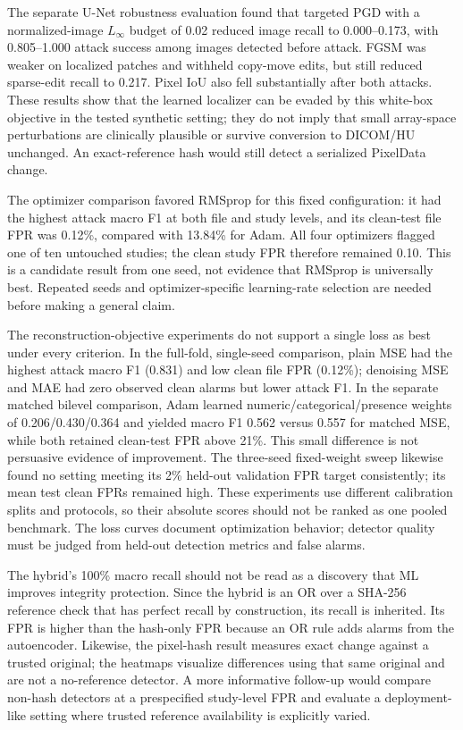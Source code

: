 \documentclass[journal]{IEEEtran}
\begin{document}
  The separate U-Net robustness evaluation found that targeted PGD with a normalized-image $L_\infty$ budget of 0.02 reduced image recall to 0.000--0.173, with 0.805--1.000 attack success among images detected before attack. FGSM was weaker on localized patches and withheld copy-move edits, but still reduced sparse-edit recall to 0.217. Pixel IoU also fell substantially after both attacks. These results show that the learned localizer can be evaded by this white-box objective in the tested synthetic setting; they do not imply that small array-space perturbations are clinically plausible or survive conversion to DICOM/HU unchanged. An exact-reference hash would still detect a serialized PixelData change.
  
  The optimizer comparison favored RMSprop for this fixed configuration: it had the highest attack macro F1 at both file and study levels, and its clean-test file FPR was 0.12\%, compared with 13.84\% for Adam. All four optimizers flagged one of ten untouched studies; the clean study FPR therefore remained 0.10. This is a candidate result from one seed, not evidence that RMSprop is universally best. Repeated seeds and optimizer-specific learning-rate selection are needed before making a general claim.

  The reconstruction-objective experiments do not support a single loss as best under every criterion. In the full-fold, single-seed comparison, plain MSE had the highest attack macro F1 (0.831) and low clean file FPR (0.12\%); denoising MSE and MAE had zero observed clean alarms but lower attack F1. In the separate matched bilevel comparison, Adam learned numeric/categorical/presence weights of 0.206/0.430/0.364 and yielded macro F1 0.562 versus 0.557 for matched MSE, while both retained clean-test FPR above 21\%. This small difference is not persuasive evidence of improvement. The three-seed fixed-weight sweep likewise found no setting meeting its 2\% held-out validation FPR target consistently; its mean test clean FPRs remained high. These experiments use different calibration splits and protocols, so their absolute scores should not be ranked as one pooled benchmark. The loss curves document optimization behavior; detector quality must be judged from held-out detection metrics and false alarms.
  
  The hybrid's 100\% macro recall should not be read as a discovery that ML improves integrity protection. Since the hybrid is an OR over a SHA-256 reference check that has perfect recall by construction, its recall is inherited. Its FPR is higher than the hash-only FPR because an OR rule adds alarms from the autoencoder. Likewise, the pixel-hash result measures exact change against a trusted original; the heatmaps visualize differences using that same original and are not a no-reference detector. A more informative follow-up would compare non-hash detectors at a prespecified study-level FPR and evaluate a deployment-like setting where trusted reference availability is explicitly varied.
  
\end{document}
